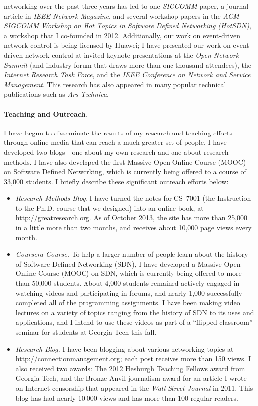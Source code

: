 \begin{itemize}
networking over the past three years has led to one {\em SIGCOMM} paper,
a journal article in {\em IEEE Network Magazine}, and several workshop
papers in the {\em ACM SIGCOMM Workshop on Hot Topics in Software
Defined Networking (HotSDN)}, a workshop that I co-founded in 2012.
Additionally, our work on event-driven network control is being licensed
by Huawei; I have presented our work on event-driven network control at
invited keynote presentations at the {\em Open Network Summit} (and
industry forum that draws more than one thousand attendees), the {\em
Internet Research Task Force}, and the {\em IEEE Conference on Network
and Service Management}.  This research has also appeared in many popular
technical publications such as {\em Ars Technica}.
\end{itemize}

\paragraph{Teaching and Outreach.}
I have begun to disseminate the results of my research and teaching
efforts through online media that can reach a much greater set of
people.  I have developed two blogs---one about my own research and one
about research methods.  I have also developed the first Massive Open
Online Course (MOOC) on Software Defined Networking, which is currently
being offered to a course of 33,000 students.  I briefly describe these
significant outreach efforts below:
\begin{itemize}
\item {\em Research Methods Blog.} I have turned the 
notes for CS~7001 (the Instruction to the Ph.D. course that we designed)
into an online book, at \url{http://greatresearch.org}.  As of October
2013, the site has more than 25,000 in a little more than two months,
and receives about 10,000 page views every month.
\item {\em Coursera Course.} To help a larger number of people learn
about the history of Software Defined Networking (SDN), I have developed
a Massive Open Online Course (MOOC) on SDN, which is currently being
offered to more than 50,000 students.  About 4,000 students remained
actively engaged in watching videos and participating in forums, and
nearly 1,000 successfully completed all of the programming assignments.
I have been making video lectures on a variety of topics ranging from
the history of SDN to its uses and applications, and I intend to use
these videos as part of a ``flipped classroom'' seminar for students at
Georgia Tech this fall.
%
\item {\em Research Blog.} I have been blogging about various networking topics
at \url{http://connectionmanagement.org}; each post receives more
than 150 views.  I also received two awards: The 2012 Hesburgh Teaching
Fellows award from Georgia Tech, and the Bronze Anvil journalism award
for an article I wrote on Internet censorship that appeared in the {\em
Wall Street Journal} in 2011.  This blog has had nearly 10,000 views and
has more than 100 regular readers.
%
\end{itemize}

